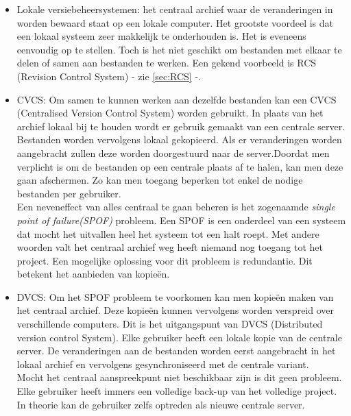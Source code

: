\begin{itemize}
	\item Lokale versiebeheersystemen: het centraal archief waar de veranderingen in worden bewaard staat op een lokale computer. Het grootste voordeel is dat een lokaal systeem zeer makkelijk te onderhouden is. Het is eveneens eenvoudig op te stellen. Toch is het niet geschikt om bestanden met elkaar te  delen of samen aan bestanden te werken. Een gekend voorbeeld is RCS (Revision Control System) - zie \ref{sec:RCS} -. \\
	
	\item CVCS: Om samen te kunnen werken aan dezelfde bestanden kan een CVCS (Centralised Version Control System) worden gebruikt. In plaats van het archief lokaal bij te houden wordt er gebruik gemaakt van een centrale server. Bestanden worden vervolgens lokaal gekopieerd. Als er veranderingen worden aangebracht zullen deze worden doorgestuurd naar de server.Doordat men verplicht is om de bestanden op een centrale plaats af te halen, kan men deze gaan afschermen. Zo kan men toegang beperken tot enkel de nodige bestanden per gebruiker. \\
	
Een neveneffect van alles centraal te gaan beheren is het zogenaamde \textit{single point of failure(SPOF)} probleem. Een SPOF is een onderdeel van een systeem dat mocht het uitvallen heel het systeem tot een halt roept. Met andere woorden valt het centraal archief weg heeft niemand nog toegang tot het project. Een mogelijke oplossing voor dit probleem is redundantie. Dit betekent het aanbieden van kopieën. \autocite{Sun2007}\\

	\item DVCS: Om het SPOF probleem te voorkomen kan men kopieën maken van het centraal archief. Deze kopieën kunnen vervolgens worden verspreid over verschillende computers. Dit is het uitgangspunt van DVCS (Distributed version control System). Elke gebruiker heeft een lokale kopie van de centrale server. De veranderingen aan de bestanden worden eerst aangebracht in het lokaal archief en vervolgens gesynchroniseerd met de centrale variant.\\

Mocht het centraal aanspreekpunt niet beschikbaar zijn is dit geen probleem. Elke gebruiker heeft immers een volledige back-up van het volledige project. In theorie kan de gebruiker zelfs optreden als nieuwe centrale server.
\end{itemize}


